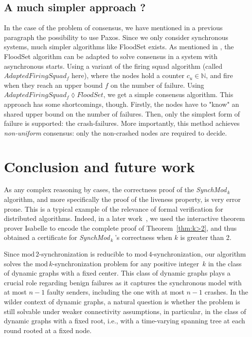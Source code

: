 \documentclass{article}
\newcommand{\SM}{{\em SynchMod}$_{\,k}\ $}
\begin{document}
\subsection{A much simpler approach ?}

In the case of the problem of consensus, we have mentioned in a previous paragraph the possibility to use Paxos.
Since we only consider synchronous systems, much simpler algorithms like FloodSet \cite{Lyn96} exists.
As mentioned in \cite{CDDS85}, the FloodSet algorithm can be adapted to solve consensus in a system with asynchronous starts.
Using a variant of the firing squad algorithm (called $AdaptedFiringSquad_f$ here),
where the nodes hold a counter $c_u \in \mathds{N}$, and fire when they reach an upper bound $f$ on the number of failure.
Using $AdaptedFiringSquad_f \lozenge FloodSet$, we get a simple consensus algorithm.
This approach has some shortcomings, though.
Firstly, the nodes have to "know" an shared upper bound on the number of failures.
Then, only the simplest form of failure is supported: the crash-failures.
More importantly, this method achieves \textit{non-uniform} consensus: only the non-crashed nodes are required to decide.

\section{Conclusion and future work}

As any complex reasoning by cases, the correctness proof  of the \SM   algorithm, 
	and more specifically the proof of the liveness property, is very error prone. 
This is a typical example of the relevance of formal verification for distributed algorithms. 
Indeed, in a later work~\cite{}, we used the interactive theorem prover Isabelle \cite{Merz12} to encode the complete proof 
	of Theorem~\ref{thm:k>2}, and thus obtained a certificate for  \SM\!\!'s correctness when $k$ is greater than 2.
	
Since $\mathrm{mod}\,2$-synchronization is reducible to $\mathrm{mod}\,4$-synchronization,
	 our algorithm solves the $\mathrm{mod}\,k$-synchronization problem for any positive integer~$k$
	 in the class of  dynamic  graphs with a fixed center.
This class of dynamic graphs plays a crucial role regarding benign failures as it captures 
	the synchronous model with at most $n-1$ faulty senders, including the one with at most $n-1$ crashes.
In the wilder context of dynamic graphs, a natural question is whether the problem is still solvable 
	under weaker connectivity assumptions, in particular, in the class of dynamic graphs with a fixed root, 
	i.e., with a time-varying spanning tree at each round rooted at a fixed node.

\printbibliography
\end{document}
